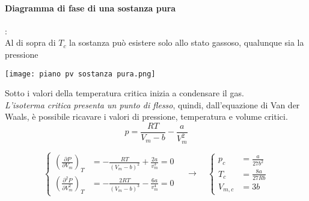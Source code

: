 \documentclass{article}
\newcommand{\so}{\quad \rightarrow \quad}
\begin{document}
\paragraph{Diagramma di fase di una sostanza pura}:\\ Al di sopra di $T_c$ la sostanza può esistere solo allo stato gassoso, qualunque sia la pressione
\begin{center}
    \texttt{[image: piano pv sostanza pura.png]}
\end{center}
Sotto i valori della temperatura critica inizia a condensare il gas. \\
\textit{L'isoterma critica presenta un punto di flesso}, quindi, dall'equazione di Van der Waals, è possibile ricavare i valori di pressione, temperatura e volume critici.
\begin{equation*}
    p=\frac{RT}{V_m-b}-\frac{a}{V_m^2}
\end{equation*}

\begin{equation*}
    \begin{cases}
        (\frac{\partial P}{\partial V_m})_T&=-\frac{RT}{(V_m-b)^2}+\frac{2a}{v_m^3}=0\\
        (\frac{\partial^2 P}{\partial V_m^2})_T&=-\frac{2RT}{(V_m-b)^3}-\frac{6a}{v_m^4}=0
    \end{cases}
    \so
    \begin{cases}
        p_c&=\frac{a}{27b^2} \\
        T_c&=\frac{8a}{27Rb} \\
        V_{m,c}&=3b 
    \end{cases}
\end{equation*}
\end{document}
